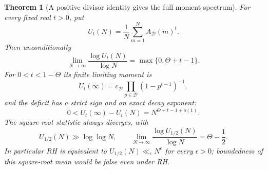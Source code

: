 \documentclass[11pt]{article}
\newtheorem{theorem}{Theorem}[section]
\theoremstyle{definition}
\begin{document}
\begin{theorem}[A positive divisor identity gives the full moment spectrum]
\label{thm:deleted-component-moment-spectrum}
For every fixed real $t>0$, put
\[
 U_t(N)=\frac1N\sum_{m=1}^N A_{\mathcal D}(m)^t.
\]
Then unconditionally
\begin{equation}
 \lim_{N\to\infty}\frac{\log U_t(N)}{\log N}
                         =\max\{0,\Theta+t-1\}.
 \label{eq:deleted-component-moment-spectrum}
\end{equation}
For $0<t<1-\Theta$ its finite limiting moment is
\[
 U_t(\infty)
 =c_{\mathcal D}\prod_{p\in\mathcal D}(1-p^{t-1})^{-1},
\]
and the deficit has a strict sign and an exact decay exponent:
\begin{equation}
 0<U_t(\infty)-U_t(N)
                 =N^{\Theta+t-1+o(1)}.
 \label{eq:deleted-component-moment-deficit}
\end{equation}
The square-root statistic always diverges, with
\begin{equation}
 U_{1/2}(N)\gg\log\log N,\qquad
 \lim_{N\to\infty}\frac{\log U_{1/2}(N)}{\log N}
                                      =\Theta-\frac12 .
 \label{eq:deleted-component-square-root-readout}
\end{equation}
In particular RH is equivalent to
$U_{1/2}(N)\ll_\epsilon N^\epsilon$ for every $\epsilon>0$;
boundedness of this square-root mean would be false even under RH.
\end{theorem}
\end{document}
